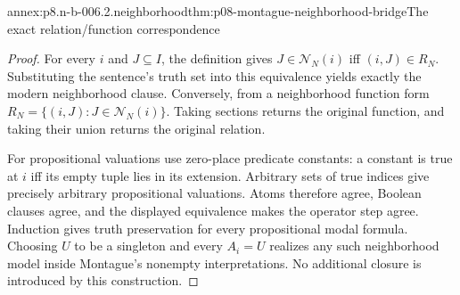\begin{annexitem}{annex:p8.n-b-006.2.neighborhood}{thm:p08-montague-neighborhood-bridge}{The exact relation/function correspondence}
\begin{proof}
For every \(i\) and \(J\subseteq I\), the definition gives
\(J\in\mathcal N_N(i)\) iff \((i,J)\in R_N\). Substituting the
sentence's truth set into this equivalence yields exactly the modern
neighborhood clause. Conversely, from a neighborhood function form
\(R_N=\{(i,J):J\in\mathcal N_N(i)\}\). Taking sections returns
the original function, and taking their union returns the original
relation.

For propositional valuations use zero-place predicate constants: a
constant is true at \(i\) iff its empty tuple lies in its extension.
Arbitrary sets of true indices give precisely arbitrary propositional
valuations. Atoms therefore agree, Boolean clauses agree, and the
displayed equivalence makes the operator step agree. Induction gives
truth preservation for every propositional modal formula. Choosing
\(U\) to be a singleton and every \(A_i=U\) realizes any such
neighborhood model inside Montague's nonempty interpretations. No
additional closure is introduced by this construction.
\end{proof}
\end{annexitem}

